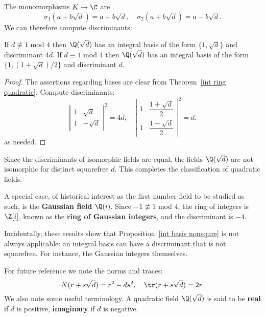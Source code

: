 The monomorphisms $K\to\C$ are
\[\sigma_1(a+b\sqrt{d})=a+b\sqrt{d},\quad \sigma_2(a+b\sqrt{d})=a-b\sqrt{d}.\]
We can therefore compute discriminants:
\begin{theorem}
If $d\not\equiv 1$ mod $4$ then $\Q(\sqrt{d})$ has an integral basis of the form $\{1,\sqrt{d}\}$ and discriminant $4d$. If $d\equiv 1$ mod $4$ then $\Q(\sqrt{d})$ has an integral basis of the form $\{1,(1+\sqrt{d})/2\}$ and discriminant $d$.
\end{theorem}
\begin{proof}
The assertions regarding bases are clear from Theorem~\ref{int ring quadratic}. Compute discriminants:
\[\left|\begin{array}{cc}
1&\sqrt{d}\\
1&-\sqrt{d}
\end{array}\right|^2=4d,\quad \left|\begin{array}{cc}
1&\dfrac{1+\sqrt{d}}{2}\\[8pt]
1&\dfrac{1-\sqrt{d}}{2}
\end{array}\right|^2=d.\]
as needed.
\end{proof}
Since the discriminants of isomorphic fields are equal, the fields $\Q(\sqrt{d})$ are not isomorphic for distinct squarefree $d$. This completes the classification of quadratic fields.\par
A special case, of historical interest as the first number field to be studied
as such, is the \textbf{Gaussian field} $\Q(i)$. Since $-1\not\equiv1$ mod $4$, the ring of integers is $\Z[i]$, known as the \textbf{ring of Gaussian integers}, and the discriminant is $-4$.\par
Incidentally, these results show that Proposition~\ref{int basis nonsqure} is not always applicable: an integral basis can have a discriminant that is not squarefree. For instance, the Gaussian integers themselves.\par
For future reference we note the norms and traces:
\[N(r+s\sqrt{d})=r^2-ds^2,\quad \tr(r+s\sqrt{d})=2r.\]
We also note some useful terminology. A quadratic field $\Q(\sqrt{d})$ is said to be \textbf{real} if $d$ is positive, \textbf{imaginary} if $d$ is negative.
